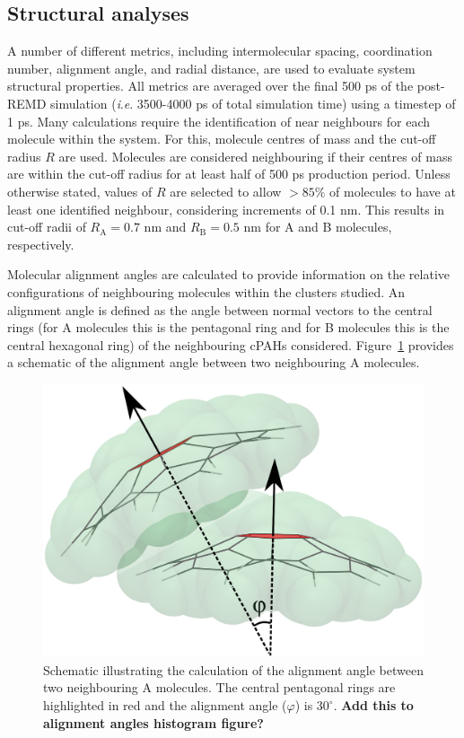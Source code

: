 \subsection{Structural analyses}
A number of different metrics, including intermolecular spacing, coordination number, alignment angle, and radial distance, are used to evaluate system structural properties. All metrics are averaged over the  final 500 ps of the post-REMD simulation (\textit{i}.\textit{e}. 3500-4000 ps of total simulation time) using a timestep of 1 ps. 
Many calculations require the identification of near neighbours for each molecule within the system. For this, molecule centres of mass and the cut-off radius $R$ are used. Molecules are considered neighbouring if their centres of mass are within the cut-off radius for at least half of 500 ps production period. Unless otherwise stated, values of $R$ are selected to allow $>85\%$ of molecules to have at least one identified neighbour, considering increments of 0.1 nm. This results in cut-off radii of $R_{\text{A}} = 0.7$ nm and $R_{\text{B}} = 0.5$ nm for A and B molecules, respectively. 


Molecular alignment angles are calculated to provide information on the relative configurations of neighbouring molecules within the clusters studied. An alignment angle is defined as the angle between normal vectors to the central rings (for A molecules this is the pentagonal ring and for B molecules this is the central hexagonal ring) of the neighbouring cPAHs considered.  Figure~\ref{fig:alignmentangle_schematic} provides a schematic of the alignment angle between two neighbouring A molecules.
%
\begin{figure}[!tbh]
\centering
\includegraphics[width=0.25\linewidth]{Figures/alignment_angle_schematic.eps}
\caption{Schematic illustrating the calculation of the alignment angle between two neighbouring A molecules. The central pentagonal rings are highlighted in red and the alignment angle ($\varphi$) is $30^{\circ}$. \textbf{Add this to alignment angles histogram figure?}}
\label{fig:alignmentangle_schematic}
\end{figure}
%

